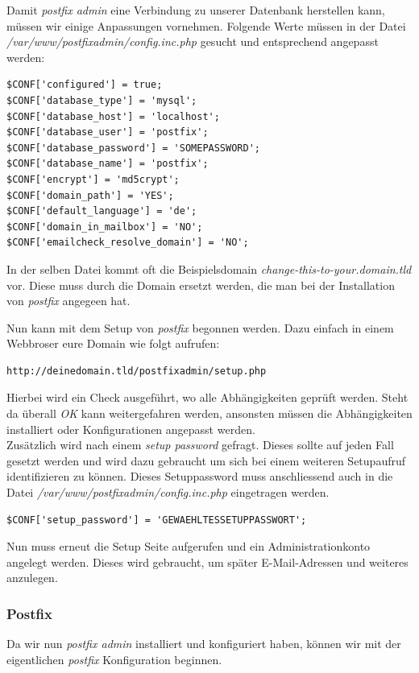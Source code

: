Damit \textit{postfix admin} eine Verbindung zu unserer Datenbank herstellen kann, müssen wir einige Anpassungen vornehmen. Folgende Werte müssen in der Datei \textit{/var/www/postfixadmin/config.inc.php} gesucht und entsprechend angepasst werden:

\begin{lstlisting}
$CONF['configured'] = true;
$CONF['database_type'] = 'mysql';
$CONF['database_host'] = 'localhost';
$CONF['database_user'] = 'postfix';
$CONF['database_password'] = 'SOMEPASSWORD';
$CONF['database_name'] = 'postfix';
$CONF['encrypt'] = 'md5crypt';
$CONF['domain_path'] = 'YES';
$CONF['default_language'] = 'de';
$CONF['domain_in_mailbox'] = 'NO';
$CONF['emailcheck_resolve_domain'] = 'NO';
\end{lstlisting}

In der selben Datei kommt oft die Beispielsdomain \textit{change-this-to-your.domain.tld} vor. Diese muss durch die Domain ersetzt werden, die man bei der Installation von \textit{postfix} angegeen hat.

Nun kann mit dem Setup von \textit{postfix} begonnen werden. Dazu einfach in einem Webbroser eure Domain wie folgt aufrufen:

\begin{lstlisting}
http://deinedomain.tld/postfixadmin/setup.php
\end{lstlisting}

Hierbei wird ein Check ausgeführt, wo alle Abhängigkeiten geprüft werden. Steht da überall \textit{OK} kann weitergefahren werden, ansonsten müssen die Abhängigkeiten installiert oder Konfigurationen angepasst werden. \\
Zusätzlich wird nach einem \textit{setup password} gefragt. Dieses sollte auf jeden Fall gesetzt werden und wird dazu gebraucht um sich bei einem weiteren Setupaufruf identifizieren zu können.
Dieses Setuppassword muss anschliessend auch in die Datei \textit{/var/www/postfixadmin/config.inc.php} eingetragen werden.

\begin{lstlisting}
$CONF['setup_password'] = 'GEWAEHLTESSETUPPASSWORT';
\end{lstlisting}

Nun muss erneut die Setup Seite aufgerufen und ein Administrationkonto angelegt werden. Dieses wird gebraucht, um später E-Mail-Adressen und weiteres anzulegen.

\subsubsection{Postfix}
Da wir nun \textit{postfix admin} installiert und konfiguriert haben, können wir mit der eigentlichen \textit{postfix} Konfiguration beginnen.

